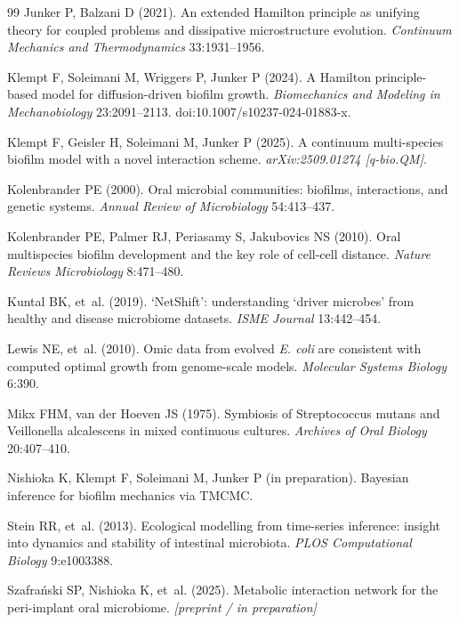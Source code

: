 \documentclass[11pt,a4paper]{article}
\begin{document}
\begin{thebibliography}{99}
Junker P, Balzani D (2021). An extended Hamilton principle as unifying theory for
coupled problems and dissipative microstructure evolution.
\textit{Continuum Mechanics and Thermodynamics} 33:1931--1956.


Klempt F, Soleimani M, Wriggers P, Junker P (2024).
A Hamilton principle-based model for diffusion-driven biofilm growth.
\textit{Biomechanics and Modeling in Mechanobiology} 23:2091--2113. doi:10.1007/s10237-024-01883-x.

Klempt F, Geisler H, Soleimani M, Junker P (2025). A continuum multi-species
biofilm model with a novel interaction scheme. \textit{arXiv:2509.01274 [q-bio.QM]}.

Kolenbrander PE (2000). Oral microbial communities: biofilms, interactions,
and genetic systems.
\textit{Annual Review of Microbiology} 54:413--437.

Kolenbrander PE, Palmer RJ, Periasamy S, Jakubovics NS (2010).
Oral multispecies biofilm development and the key role of cell-cell distance.
\textit{Nature Reviews Microbiology} 8:471--480.

Kuntal BK, et~al. (2019). `NetShift': understanding `driver microbes' from
healthy and disease microbiome datasets.
\textit{ISME Journal} 13:442--454.

Lewis NE, et~al. (2010). Omic data from evolved \textit{E. coli} are consistent
with computed optimal growth from genome-scale models.
\textit{Molecular Systems Biology} 6:390.

Mikx FHM, van der Hoeven JS (1975). Symbiosis of Streptococcus mutans and
Veillonella alcalescens in mixed continuous cultures.
\textit{Archives of Oral Biology} 20:407--410.

Nishioka K, Klempt F, Soleimani M, Junker P (in preparation).
Bayesian inference for biofilm mechanics via TMCMC.

Stein RR, et~al. (2013). Ecological modelling from time-series inference:
insight into dynamics and stability of intestinal microbiota.
\textit{PLOS Computational Biology} 9:e1003388.

Szafra\'{n}ski SP, Nishioka K, et~al. (2025). Metabolic interaction network
for the peri-implant oral microbiome. \textit{[preprint / in preparation]}


\end{thebibliography}
\end{document}
